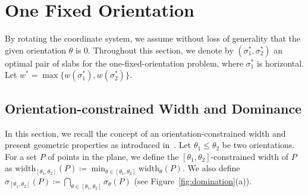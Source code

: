 \documentclass[english,a4paper, cleveref, autoref, thm-restate, nolineno]{socg-lipics-v2021}
\theoremstyle{star}
\theoremstyle{claimstar}
\newcommand{\eps}{\ensuremath{\varepsilon}}
\newcommand{\width}{\ensuremath{\mathrm{width}}}
\begin{document}
    
    
    
    


\section{One Fixed Orientation}
\label{sec:one_fixed}




By rotating the coordinate system, we assume without loss of generality that the given orientation $\theta$ is $0$. 
Throughout this section, we denote by $(\sigma_1^*, \sigma_2^*)$ an optimal pair of slabs for the one-fixed-orientation problem, where $\sigma_1^*$ is horizontal. Let $w^* = \max \{w(\sigma_1^*), w(\sigma_2^*) \}$.



\subsection{Orientation-constrained Width and Dominance}
\label{sec:one_fixed_properties}
In this section, we recall the concept of an orientation-constrained width and present geometric properties as introduced in~\cite{ahn2024constrained}.
Let $\theta_1\le \theta_2$ be two orientations. 
For a set $P$ of points in the plane, we define the $[\theta_1, \theta_2]$-constrained width of $P$ as $\width_{[\theta_1, \theta_2]}(P) \coloneq \min_{\theta \in [\theta_1, \theta_2]} \width_\theta (P).$ 
We also define $\sigma_{[\theta_1, \theta_2]}(P) \coloneq \bigcap_{\theta \in [\theta_1, \theta_2]} \sigma_\theta (P)$ (see Figure~\ref{fig:domination}(a)).
        
\end{document}
